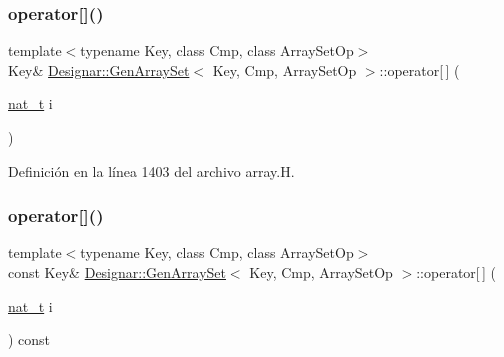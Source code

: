 \mbox{\label{class_designar_1_1_gen_array_set_ad721fdfba3af03c084a9bbfe5ec67fd8}} 
\subsubsection{\texorpdfstring{operator[]()}{operator[]()}\hspace{0.1cm}{\footnotesize\ttfamily [1/2]}}
{\footnotesize\ttfamily template$<$typename Key, class Cmp, class Array\+Set\+Op$>$ \\
Key\& \hyperlink{class_designar_1_1_gen_array_set}{Designar\+::\+Gen\+Array\+Set}$<$ Key, Cmp, Array\+Set\+Op $>$\+::operator\mbox{[}$\,$\mbox{]} (\begin{DoxyParamCaption}\item[{\hyperlink{namespace_designar_aa72662848b9f4815e7bf31a7cf3e33d1}{nat\+\_\+t}}]{i }\end{DoxyParamCaption})\hspace{0.3cm}{\ttfamily [inline]}}



Definición en la línea 1403 del archivo array.\+H.

\mbox{\label{class_designar_1_1_gen_array_set_a2731e12c87e08bc42ac16496569ebf5a}} 
\subsubsection{\texorpdfstring{operator[]()}{operator[]()}\hspace{0.1cm}{\footnotesize\ttfamily [2/2]}}
{\footnotesize\ttfamily template$<$typename Key, class Cmp, class Array\+Set\+Op$>$ \\
const Key\& \hyperlink{class_designar_1_1_gen_array_set}{Designar\+::\+Gen\+Array\+Set}$<$ Key, Cmp, Array\+Set\+Op $>$\+::operator\mbox{[}$\,$\mbox{]} (\begin{DoxyParamCaption}\item[{\hyperlink{namespace_designar_aa72662848b9f4815e7bf31a7cf3e33d1}{nat\+\_\+t}}]{i }\end{DoxyParamCaption}) const\hspace{0.3cm}{\ttfamily [inline]}}



